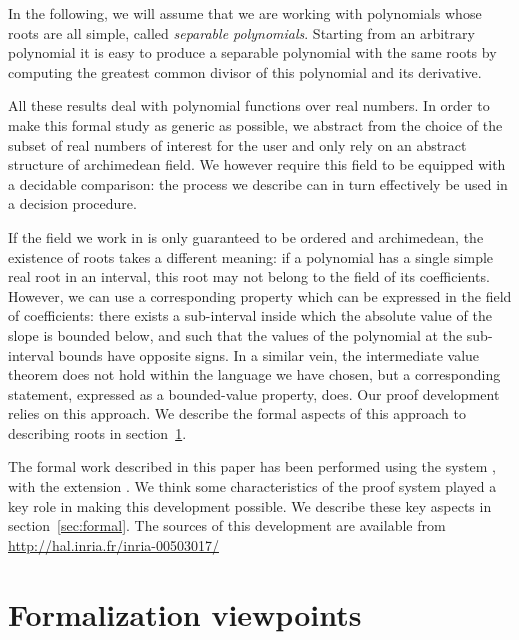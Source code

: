 \documentclass{mscs}
\begin{document}
In the following, we will assume that we are working with polynomials 
whose roots are all simple, called {\em separable polynomials}.
Starting from an arbitrary polynomial it is easy to produce a 
separable polynomial with the same roots by computing the greatest 
common divisor of this polynomial and its derivative.
 
All these results deal with polynomial functions over real numbers. In
order to make this formal study as generic as possible, we abstract
from the choice of the subset of real numbers of interest for the
user and only rely on an abstract structure of archimedean field. We
however require this field to be equipped with a decidable comparison:
the process we describe can in turn effectively be used in a decision
procedure.

If the field we work in is only guaranteed to be ordered and archimedean,
the existence of roots takes a
different meaning: if a polynomial has a single simple real root in an
interval, this root may not belong to the field of its coefficients. 
However, we can use a corresponding property which can be expressed in
the field of coefficients: there exists a
sub-interval inside which the absolute value of the slope is bounded
below, and such that the values of the polynomial at the sub-interval
bounds have opposite signs.  In a similar vein, the intermediate value
theorem  does not hold within the language we have chosen, but a
corresponding statement, expressed as a bounded-value property, does.
Our proof development relies on this approach.  We describe the formal
aspects of this approach to describing roots in
section~\ref{sec:rational}.

The formal work described in this paper has been performed using
the \Coq{} system \cite{coqart, coqsite}, with the \ssr{} extension
\cite{GONTHIER:2008:INRIA-00258384:4}.  We think some characteristics
of the proof system played a key role in making this development
possible.  We describe these key aspects in section~\ref{sec:formal}.
The sources of this development are available from\\
{\url{http://hal.inria.fr/inria-00503017/}}

\section{Formalization viewpoints}
\label{sec:rational}
\end{document}
